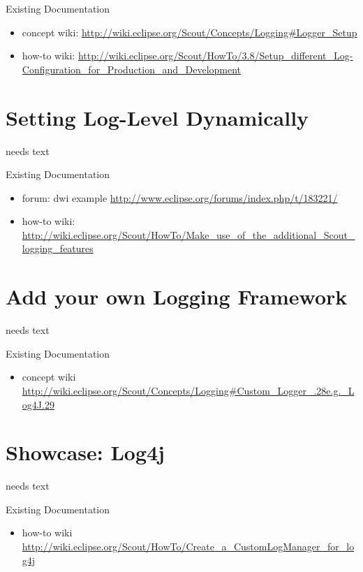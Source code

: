 \documentclass[a4paper,10pt,twoside]{book}
\begin{document}
\noindent Existing Documentation
\begin{itemize}
  \item concept wiki: \url{http://wiki.eclipse.org/Scout/Concepts/Logging#Logger_Setup}
  \item how-to wiki: \url{http://wiki.eclipse.org/Scout/HowTo/3.8/Setup_different_Log-Configuration_for_Production_and_Development}
\end{itemize}

\section{Setting Log-Level Dynamically}
needs text

\noindent Existing Documentation
\begin{itemize}
  \item forum: dwi example \url{http://www.eclipse.org/forums/index.php/t/183221/}
  \item how-to wiki: \url{http://wiki.eclipse.org/Scout/HowTo/Make_use_of_the_additional_Scout_logging_features}
\end{itemize}

\section{Add your own Logging Framework}
needs text

\noindent Existing Documentation
\begin{itemize}
  \item concept wiki \url{http://wiki.eclipse.org/Scout/Concepts/Logging#Custom_Logger_.28e.g._Log4J.29}
\end{itemize}

\section{Showcase: Log4j}
needs text

\noindent Existing Documentation
\begin{itemize}
  \item how-to wiki \url{http://wiki.eclipse.org/Scout/HowTo/Create_a_CustomLogManager_for_log4j}
\end{itemize}

\end{document}

